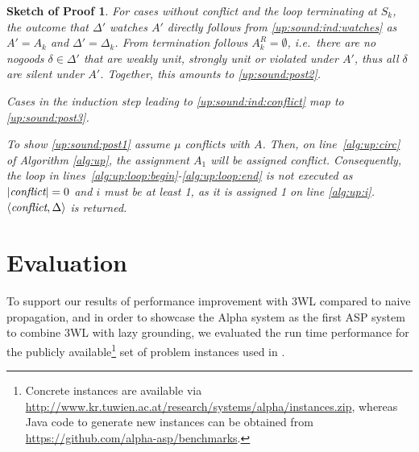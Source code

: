 \documentclass{vutinfth} %
\newtheorem{proof-sketch}{Sketch of Proof}[chapter]
\newtheorem{theorem}{Theorem}[chapter]
\newcommand{\ass}{A}
\newcommand{\sgl}{\mu}
\begin{document}
\begin{proof-sketch}
For cases without conflict and the loop terminating at $S_k$, the outcome that $\Delta'$ watches $A'$ directly follows from \ref{up:sound:ind:watches} as $\ass' = \ass_k$ and $\Delta' = \Delta_k$. From termination follows $A_k^R = \emptyset$, i.e.~there are no nogoods $\delta \in \Delta'$ that are weakly unit, strongly unit or violated under $\ass'$, thus all $\delta$ are silent under $\ass'$. Together, this amounts to \ref{up:sound:post2}.

Cases in the induction step leading to \ref{up:sound:ind:conflict} map to \ref{up:sound:post3}.

To show \ref{up:sound:post1} assume $\sgl$ conflicts with $\ass$. Then, on line~\ref{alg:up:circ} of Algorithm \ref{alg:up}, the assignment $A_1$ will be assigned \emph{conflict}. Consequently, the loop in lines~\ref{alg:up:loop:begin}-\ref{alg:up:loop:end} is not executed as $|\emph{conflict}| = 0$ and $i$ must be at least 1, as it is assigned 1 on line \ref{alg:up:i}. $\langle \emph{conflict}, \Delta \rangle$ is returned.
\end{proof-sketch}




\chapter{Evaluation}
\label{chap:eval}

To support our results of performance improvement with 3WL compared to naive propagation, and in order to showcase the Alpha system as the first ASP system to combine 3WL with lazy grounding, we evaluated the run time performance for the publicly available\footnote{Concrete instances are available via \url{http://www.kr.tuwien.ac.at/research/systems/alpha/instances.zip}, whereas Java code to generate new instances can be obtained from \url{https://github.com/alpha-asp/benchmarks}.} set of problem instances used in \cite{alpha-techniques}.
\end{document}
